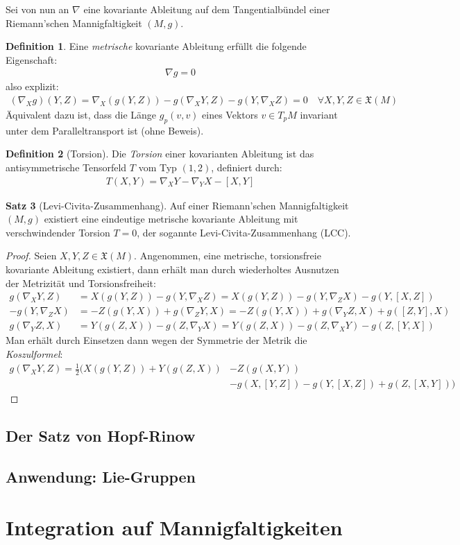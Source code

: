 \documentclass[a4paper]{scrreprt}
\numberwithin{equation}{chapter}
\newcommand{\vf}{\mathfrak{X}}
\theoremstyle{definition}
\newtheorem{defn}{Definition}[section]
\newtheorem{satz}[defn]{Satz}
\begin{document}
		Sei von nun an $\nabla$ eine kovariante Ableitung auf dem Tangentialbündel einer Riemann'schen Mannigfaltigkeit $(M,g)$.
		\begin{defn}
			Eine \emph{metrische} kovariante Ableitung erfüllt die folgende Eigenschaft:
			\begin{align*}
				\nabla g=0
			\end{align*}
			also explizit:
			\begin{align*}
				(\nabla_X g)(Y,Z)=\nabla_X(g(Y,Z))-g(\nabla_XY,Z)-g(Y,\nabla_XZ)=0\quad\forall X,Y,Z\in\vf(M)
			\end{align*}
			Äquivalent dazu ist, dass die Länge $g_p(v,v)$ eines Vektors $v\in T_pM$ invariant unter dem Paralleltransport ist (ohne Beweis). 
		\end{defn}
		\begin{defn}[Torsion]
			Die \emph{Torsion} einer kovarianten Ableitung ist das antisymmetrische Tensorfeld $T$ vom Typ $(1,2)$, definiert durch:
			\begin{align*}
				T(X,Y)=\nabla_XY-\nabla_YX-\left[X,Y\right]
			\end{align*}
		\end{defn}
		
		\begin{satz}[Levi-Civita-Zusammenhang]
			Auf einer Riemann'schen Mannigfaltigkeit $(M,g)$ existiert eine eindeutige metrische kovariante Ableitung mit verschwindender Torsion $T=0$, der sogannte Levi-Civita-Zusammenhang (LCC).
			\begin{proof}
				Seien $X,Y,Z\in\vf(M)$. Angenommen, eine metrische, torsionsfreie kovariante Ableitung existiert, dann erhält man durch wiederholtes Ausnutzen der Metrizität und Torsionsfreiheit:
				\begin{align*}
				g(\nabla_XY,Z)&=X(g(Y,Z))-g(Y,\nabla_XZ)=X(g(Y,Z))-g(Y,\nabla_ZX)-g(Y,[X,Z])\\
				-g(Y,\nabla_ZX)&=-Z(g(Y,X))+g(\nabla_ZY,X)=-Z(g(Y,X))+g(\nabla_YZ,X)+g([Z,Y],X)\\
				g(\nabla_YZ,X)&=Y(g(Z,X))-g(Z,\nabla_YX)=Y(g(Z,X))-g(Z,\nabla_XY)-g(Z,[Y,X])
				\end{align*}
				Man erhält durch Einsetzen dann wegen der Symmetrie der Metrik die \emph{Koszulformel}:
				\begin{align*}
					g(\nabla_XY,Z)=\frac{1}{2}( X(g(Y,Z))+Y(g(Z,X))&-Z(g(X,Y))\\
					&-g(X,[Y,Z])-g(Y,[X,Z])+g(Z,[X,Y]))
				\end{align*}
				
			\end{proof}
		\end{satz}
		
	\section{Der Satz von Hopf-Rinow}
	\section{Anwendung: Lie-Gruppen}


\chapter{Integration auf Mannigfaltigkeiten}
\end{document}
